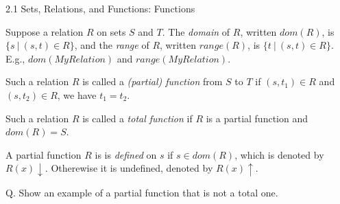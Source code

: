 \documentclass[table]{beamer}
\begin{document}
\begin{frame}[t]{2.1 Sets, Relations, and Functions: Functions} \vspace{10pt}

Suppose a relation $R$ on sets $S$ and $T$. The {\it \color{red} domain} of $R$, written $dom(R)$, is $\{ s \ | \ (s,t)\in R\}$, and the {\it \color{red} range} of $R$, written $range(R)$, is $\{ t \ | \ (s,t)\in R\}$. E.g., $dom(MyRelation)$ and $range(MyRelation)$. 

\vspace{10pt}

Such a relation $R$ is called a {\it \color{red} (partial) function} from $S$ to $T$ if $(s,t_1)\in R$ and $(s,t_2)\in R$, we have $t_1 = t_2$. 

\vspace{10pt}

Such a relation $R$ is called a {\it \color{red} total function} if $R$ is a partial function and $dom(R)=S$. 

\vspace{10pt}

A partial function $R$ is is {\it defined} on $s$ if $s \in dom(R)$, which is denoted by {\color{red} $R(x) \downarrow$}. Otherewise it is {undefined}, denoted by {\color{red} $R(x) \uparrow$}.

\vspace{10pt}

Q. Show an example of a partial function that is not a total one.

\end{frame}
\end{document}
